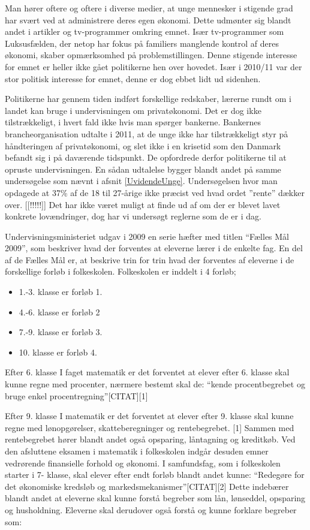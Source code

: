 Man hører oftere og oftere i diverse medier, at unge mennesker i stigende grad har svært ved at administrere deres egen økonomi. Dette udmønter sig blandt andet i artikler og tv-programmer omkring emnet. Især tv-programmer som Luksusfælden, der netop har fokus på familiers manglende kontrol af deres økonomi, skaber opmærksomhed på problemstillingen. Denne stigende interesse for emnet er heller ikke gået politikerne hen over hovedet. Især i 2010/11 var der stor politisk interesse for emnet, denne er dog ebbet lidt ud sidenhen.

Politikerne har gennem tiden indført forskellige redskaber, lærerne rundt om i landet kan bruge i undervisningen om privatøkonomi. Det er dog ikke tilstrækkeligt, i hvert fald ikke hvis man spørger bankerne. Bankernes brancheorganisation udtalte i 2011, at de unge ikke har tilstrækkeligt styr på håndteringen af privatøkonomi, og slet ikke i en krisetid som den Danmark befandt sig i på daværende tidspunkt. De opfordrede derfor politikerne til at opruste undervisningen. En sådan udtalelse bygger blandt andet på samme undersøgelse som nævnt i afsnit \ref{UvidendeUnge}. Undersøgelsen hvor man opdagede at 37\% af de 18 til 27-årige ikke præcist ved hvad ordet ”rente” dækker over. [[!!!!!]] Det har ikke været muligt at finde ud af om der er blevet lavet konkrete lovændringer, dog har vi undersøgt reglerne som de er i dag.


Undervisningsministeriet udgav i 2009 en serie hæfter med titlen “Fælles Mål 2009”, som beskriver hvad der forventes at eleverne lærer i de enkelte fag. En del af de Fælles Mål er, at beskrive trin for trin hvad der forventes af eleverne i de forskellige forløb i folkeskolen. Folkeskolen er inddelt i 4 forløb;

\noindent \begin{itemize}
\item{1.-3. klasse er forløb 1.}
\item{4.-6. klasse er forløb 2}
\item{7.-9. klasse er forløb 3.}
\item{10. klasse er forløb 4.}
\end{itemize}


Efter 6. klasse
I faget matematik er det forventet at elever efter 6. klasse skal kunne regne med procenter,
nærmere bestemt skal de: “kende procentbegrebet og bruge enkel procentregning”[CITAT][1]

Efter 9. klasse
I matematik er det forventet at elever efter 9. klasse skal kunne regne med lønopgørelser, skatteberegninger og rentebegrebet. [1] Sammen med rentebegrebet hører blandt andet også opsparing, låntagning og kreditkøb.
Ved den afsluttene eksamen i matematik i folkeskolen indgår desuden emner vedrørende finansielle forhold og økonomi.
I samfundsfag, som i folkeskolen starter i 7- klasse, skal elever efter endt forløb blandt andet kunne: “Redegøre for det økonomiske kredsløb og markedsmekanismer”[CITAT][2]
Dette indebærer blandt andet at eleverne skal kunne forstå begreber som lån, lønseddel, opsparing og husholdning.
Eleverne skal derudover også forstå og kunne forklare begreber som: 


